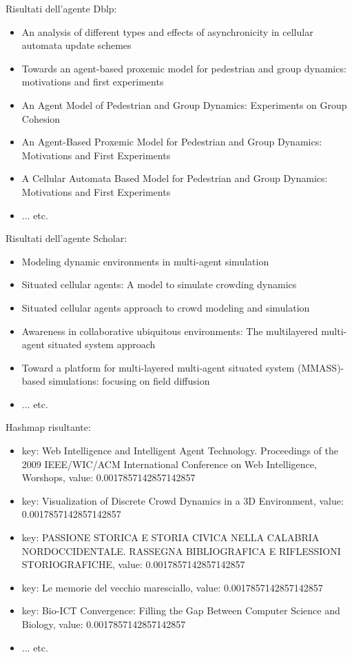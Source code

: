 \documentclass[12pt]{article}
\begin{document}
Risultati dell'agente Dblp:
\begin{itemize}
\item An analysis of different types and effects of asynchronicity in cellular automata update schemes
\item Towards an agent-based proxemic model for pedestrian and group dynamics: motivations and first experiments
\item An Agent Model of Pedestrian and Group Dynamics: Experiments on Group Cohesion
\item An Agent-Based Proxemic Model for Pedestrian and Group Dynamics: Motivations and First Experiments
\item A Cellular Automata Based Model for Pedestrian and Group Dynamics: Motivations and First Experiments
\item ... etc.
\end{itemize}

Risultati dell'agente Scholar:
\begin{itemize}
\item Modeling dynamic environments in multi-agent simulation
\item Situated cellular agents: A model to simulate crowding dynamics
\item Situated cellular agents approach to crowd modeling and simulation
\item Awareness in collaborative ubiquitous environments: The multilayered multi-agent situated system approach
\item Toward a platform for multi-layered multi-agent situated system (MMASS)-based simulations: focusing on field diffusion
\item ... etc.
\end{itemize}

Hashmap risultante:
\begin{itemize}
\item key: Web Intelligence and Intelligent Agent Technology. Proceedings of the 2009 IEEE/WIC/ACM International Conference on Web Intelligence, Worshops, value: 0.0017857142857142857
\item key: Visualization of Discrete Crowd Dynamics in a 3D Environment, value: 0.0017857142857142857
\item key: PASSIONE STORICA E STORIA CIVICA NELLA CALABRIA NORDOCCIDENTALE. RASSEGNA BIBLIOGRAFICA E RIFLESSIONI STORIOGRAFICHE, value: 0.0017857142857142857
\item key: Le memorie del vecchio maresciallo, value: 0.0017857142857142857
\item key: Bio-ICT Convergence: Filling the Gap Between Computer Science and Biology, value: 0.0017857142857142857
\item ... etc.
\end{itemize}
\end{document}
